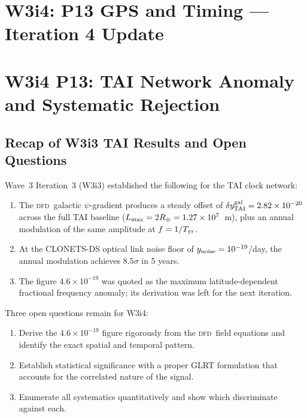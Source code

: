 \documentclass[aps,prd,twocolumn,superscriptaddress,nofootinbib]{revtex4-2}
\newcommand{\DFD}{\textsc{dfd}}
\begin{document}
\section*{W3i4: P13 GPS and Timing --- Iteration 4 Update}

\section{W3i4 P13: TAI Network Anomaly and Systematic Rejection}
\label{sec:main}

\subsection{Recap of W3i3 TAI Results and Open Questions}

Wave~3 Iteration~3 (W3i3) established the following for the TAI clock network:

\begin{enumerate}
\item The \DFD\ galactic $\psi$-gradient produces a steady offset of
      $\delta y^{\rm gal}_{\rm TAI} = 2.82\times10^{-20}$ across the full
      TAI baseline ($L_{\rm max} = 2R_\oplus = 1.27\times10^7$~m), plus
      an annual modulation of the same amplitude at $f = 1/T_{\rm yr}$.

\item At the CLONETS-DS optical link noise floor of $y_{\rm noise} = 10^{-19}$/day,
      the annual modulation achieves $8.5\sigma$ in 5 years.

\item The figure $4.6\times10^{-19}$ was quoted as the maximum latitude-dependent
      fractional frequency anomaly; its derivation was left for the next iteration.
\end{enumerate}

Three open questions remain for W3i4:
\begin{enumerate}[label=(\alph*)]
\item Derive the $4.6\times10^{-19}$ figure rigorously from the \DFD\ field
      equations and identify the exact spatial and temporal pattern.
\item Establish statistical significance with a proper GLRT formulation that
      accounts for the correlated nature of the signal.
\item Enumerate all systematics quantitatively and show which discriminate
      against each.
\end{enumerate}
\end{document}
